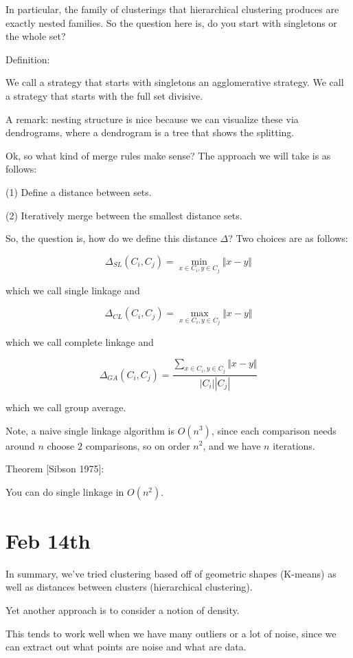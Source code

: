 \documentclass[10pt]{article}
\begin{document}
In particular, the family of clusterings that hierarchical clustering produces are exactly nested families. So the question here is, do you start with singletons or the whole set?

Definition:

We call a strategy that starts with singletons an agglomerative strategy. We call a strategy that starts with the full set divisive.

A remark: nesting structure is nice because we can visualize these via dendrograms, where a dendrogram is a tree that shows the splitting.

Ok, so what kind of merge rules make sense? The approach we will take is as follows:

(1) Define a distance between sets.

(2) Iteratively merge between the smallest distance sets.

So, the question is, how do we define this distance $\Delta$? Two choices are as follows:

$$\Delta_{SL}(C_i,C_j) = \min_{x \in C_i, y \in C_j} \Vert x -y \Vert$$ 

which we call single linkage and

$$\Delta_{CL}(C_i,C_j) = \max_{x \in C_i, y \in C_j} \Vert x -y \Vert$$

which we call complete linkage and

$$ \Delta_{GA}(C_i, C_j) = \frac{ \sum_{x \in C_i, y \in C_j} \Vert x - y \Vert }{ |C_i ||C_j| }$$

which we call group average.

Note, a naive single linkage algorithm is $O(n^3)$, since each comparison needs around $n$ choose $2$ comparisons, so on order $n^2$, and we have $n$ iterations.

Theorem [Sibson 1975]:

You can do single linkage in $O(n^2)$. 

\section*{Feb 14th}

In summary, we’ve tried clustering based off of geometric shapes (K-means) as well as distances between clusters (hierarchical clustering).

Yet another approach is to consider a notion of density.

This tends to work well when we have many outliers or a lot of noise, since we can extract out what points are noise and what are data.
\end{document}
